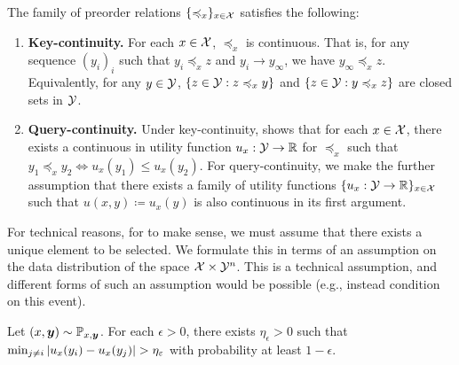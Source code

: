 \begin{assumption}\label{ass:qk_cts}
  The family of preorder relations $\{\preccurlyeq_x\}_{x \in {\mathcal{X}}}$ satisfies the following:
  \begin{enumerate}
    \item \textbf{Key-continuity.} For each $x \in {\mathcal{X}}$, $\preceq_x$ is continuous. That is, for any sequence $(y_i)_i$ such that $y_i \preceq_x z$ and $y_i \to y_{\infty}$, we have $y_\infty \preceq_x z$. Equivalently, for any $y \in {\mathcal{Y}}$, $\{z \in {\mathcal{Y}} : z \preccurlyeq_x y\}$ and $\{z \in {\mathcal{Y}} : y \preccurlyeq_x z\}$ are closed sets in ${\mathcal{Y}}$.
    \item \textbf{Query-continuity.} Under key-continuity, \citet{debreu1954representation} shows that for each $x \in {\mathcal{X}}$, there exists a continuous in utility function $u_x: {\mathcal{Y}} \to \mathbb{R}$ for $\preceq_x$ such that $y_1 \preceq_x y_2 \iff u_x(y_1) \leq u_x(y_2)$. For query-continuity, we make the further assumption that there exists a family of utility functions $\{u_x: {\mathcal{Y}} \to \mathbb{R}\}_{x \in {\mathcal{X}}}$ such that  $u(x, y) \coloneq u_x(y)$ is also continuous in its first argument.
  \end{enumerate}
\end{assumption}

For technical reasons, for  to make sense, we must assume that there exists a unique element to be selected. We formulate this in terms of an assumption on the data distribution of the space ${\mathcal{X}} \times {\mathcal{Y}}^n$. This is a technical assumption, and different forms of such an assumption would be possible (e.g., instead condition on this event).
\begin{assumption}\label{ass:select_unique}
  Let $(x, \bm{y}) \sim {\mathbb{P}}_{x,\bm{y}}$. For each $\epsilon > 0$, there exists $\eta_\epsilon > 0$ such that $\min_{j \neq i} \left\lvert u_x(y_i) - u_x(y_j)\right\rvert > \eta_\varepsilon$ with probability at least $1 - \epsilon$.
\end{assumption}


